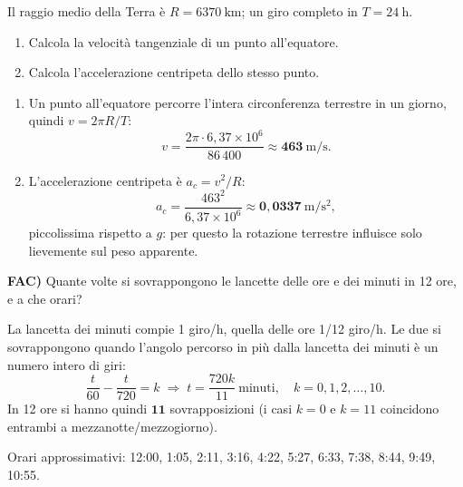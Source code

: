 
\begin{question}[ID=1.13, subtitle={Velocità tangenziale e accelerazione centripeta all'equatore terrestre}, tags={moto circolare, Terra}, difficulty=media]
Il raggio medio della Terra è $R = 6370\ \mathrm{km}$; un giro completo in $T = 24\ \mathrm{h}$.
\begin{enumerate}
\item Calcola la velocità tangenziale di un punto all'equatore.
\item Calcola l'accelerazione centripeta dello stesso punto.
\end{enumerate}
\begin{solution}
\begin{enumerate}
\item Un punto all'equatore percorre l'intera circonferenza terrestre in un giorno, quindi $v = 2\pi R/T$:
\[
v = \frac{2\pi\cdot 6{,}37\times10^6}{86\,400} \approx \mathbf{463\ \mathrm{m/s}}.
\]
\item L'accelerazione centripeta è $a_c = v^2/R$:
\[
a_c = \frac{463^2}{6{,}37\times10^6} \approx \mathbf{0{,}0337\ \mathrm{m/s^2}},
\]
piccolissima rispetto a $g$: per questo la rotazione terrestre influisce solo lievemente sul peso apparente.
\end{enumerate}
\end{solution}
\end{question}


\begin{question}[ID=fac, subtitle={Sovrapposizione delle lancette in 12 ore}, tags={moto circolare}, difficulty=difficile]
\textbf{FAC)} Quante volte si sovrappongono le lancette delle ore e dei minuti in 12 ore, e a che orari?
\begin{solution}
La lancetta dei minuti compie 1 giro/h, quella delle ore 1/12 giro/h. Le due si sovrappongono quando l'angolo percorso in più dalla lancetta dei minuti è un numero intero di giri:
\[
\frac{t}{60} - \frac{t}{720} = k \;\Rightarrow\; t = \frac{720k}{11}\ \text{minuti}, \quad k = 0,1,2,\ldots,10.
\]
In 12 ore si hanno quindi $\mathbf{11}$ sovrapposizioni (i casi $k = 0$ e $k = 11$ coincidono entrambi a mezzanotte/mezzogiorno).

Orari approssimativi: 12:00, 1:05, 2:11, 3:16, 4:22, 5:27, 6:33, 7:38, 8:44, 9:49, 10:55.
\end{solution}
\end{question}
